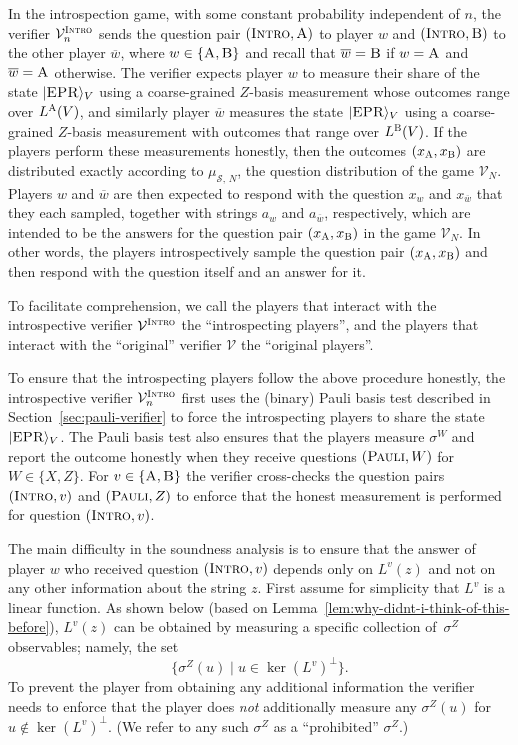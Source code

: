\documentclass[11pt]{article}
\theoremstyle{definition}
\newcommand{\ket}[1]{|#1\rangle}
\newcommand{\ol}[1]{\overline{#1}}
\newcommand{\sampler}{\mathcal{S}}
\newcommand{\verifier}{\mathcal{V}}
\newcommand{\gamestyle}[1]{\ensuremath{\textsc{#1}}\xspace}
\newcommand{\intro}{\gamestyle{Intro}}
\newcommand{\labelstyle}[1]{\ensuremath{\textsc{#1}}\xspace}
\newcommand{\EPR}{\labelstyle{EPR}}
\newcommand{\trole}{\ensuremath{v}} %
\newcommand{\alice}{\labelstyle{A}}
\newcommand{\bob}{\labelstyle{B}}
\newcommand{\typestyle}[1]{\ensuremath{\textsc{#1}}\xspace}
\newcommand{\Pauli}{\typestyle{Pauli}}
\newcommand{\Introspect}{\typestyle{Intro}}
\newcommand{\AB}{\{\alice, \bob\}}
\begin{document}
In the introspection game, with some constant probability independent of $n$,
the verifier $\verifier^\intro_n$ sends the question pair $(\Introspect,\alice)$
to player $w$ and $(\Introspect,\bob)$ to the other player $\overline{w}$, where
$w \in \AB$ and recall that $\overline{w}=\bob$ if $w=\alice$ and
$\overline{w}=\alice$ otherwise.
The verifier expects player $w$ to measure their share of the state
$\ket{\EPR}_V$ using a coarse-grained $Z$-basis measurement whose outcomes range
over $L^\alice(V)$, and similarly player $\overline{w}$ measures the state
$\ket{\EPR}_V$ using a coarse-grained $Z$-basis measurement with outcomes that
range over $L^\bob(V)$.
If the players perform these measurements honestly, then the outcomes
$(x_\alice,x_\bob)$ are distributed exactly according to $\mu_{\sampler,\, N}$, the
question distribution of the game $\verifier_N$.
Players $w$ and $\overline{w}$ are then expected to respond with the question
$x_w$ and $x_{\ol{w}}$ that they each sampled, together with strings $a_w$ and
$a_{\overline{w}}$, respectively, which are intended to be the answers for the
question pair $(x_\alice,x_\bob)$ in the game $\verifier_N$.
In other words, the players introspectively sample the question pair
$(x_\alice,x_\bob)$ and then respond with the question itself and an answer for
it.

To facilitate comprehension, we call the players that interact with the
introspective verifier $\verifier^\intro$ the ``introspecting players'', and the
players that interact with the ``original'' verifier $\verifier$ the ``original
players''.

To ensure that the introspecting players follow the above procedure honestly,
the introspective verifier $\verifier^\intro_n$ first uses the (binary) Pauli
basis test described in Section~\ref{sec:pauli-verifier} to force the
introspecting players to share the state $\ket{\EPR}_{V}$.
The Pauli basis test also ensures that the players measure $\sigma^W$ and report
the outcome honestly when they receive questions $(\Pauli, W)$ for $W \in \{X,
Z\}$.
For $v\in\{\alice,\bob\}$ the verifier cross-checks the question pairs
$(\Introspect, \trole)$ and $(\Pauli, Z)$ to enforce that the honest measurement
is performed for question $(\Introspect, \trole)$.

The main difficulty in the soundness analysis is to ensure that the answer of
player $w$ who received question $(\Introspect, \trole)$ depends only on
$L^\trole(z)$ and not on any other information about the string $z$.
First assume for simplicity that $L^\trole$ is a linear function.
As shown below (based on Lemma~\ref{lem:why-didnt-i-think-of-this-before}),
$L^\trole(z)$ can be obtained by measuring a specific collection of~$\sigma^Z$
observables; namely, the set
\begin{equation}
  \label{eq:intro-overview-z}
  \{\sigma^Z(u) \mid u \in \ker(L^\trole)^\perp\}.
\end{equation}
To prevent the player from obtaining any additional information the verifier
needs to enforce that the player does \emph{not} additionally measure any
$\sigma^Z(u)$ for $u \notin \ker(L^\trole)^\perp$.
(We refer to any such $\sigma^Z$ as a ``prohibited'' $\sigma^Z$.)
\end{document}
